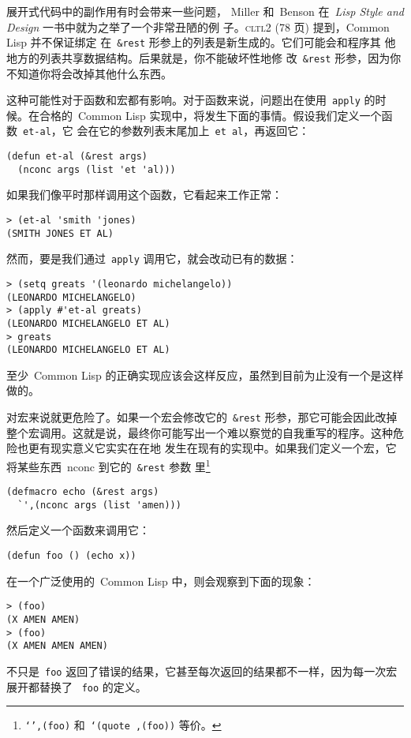 展开式代码中的副作用有时会带来一些问题，
Miller 和~Benson 在~\emph{Lisp Style and Design} 一书中就为之举了一个非常丑陋的例
子。\textsc{cltl}2 (78 页) 提到，Common Lisp 并不保证绑定
在~\texttt{\&rest} 形参上的列表是新生成的。它们可能会和程序其
他地方的列表共享数据结构。后果就是，你不能破坏性地修
改~\texttt{\&rest} 形参，因为你不知道你将会改掉其他什么东西。

这种可能性对于函数和宏都有影响。对于函数来说，问题出在使用~\texttt{apply} 的时候。在合格的~Common Lisp 实现中，将发生下面的事情。假设我们定义一个函数~\texttt{et-al}，它
会在它的参数列表末尾加上~\texttt{et al}，再返回它：
\begin{lstlisting}
(defun et-al (&rest args)
  (nconc args (list 'et 'al)))
\end{lstlisting}
如果我们像平时那样调用这个函数，它看起来工作正常：
\begin{lstlisting}
> (et-al 'smith 'jones)
(SMITH JONES ET AL)
\end{lstlisting}
然而，要是我们通过~\texttt{apply} 调用它，就会改动已有的数据：
\begin{lstlisting}
> (setq greats '(leonardo michelangelo))
(LEONARDO MICHELANGELO)
> (apply #'et-al greats)
(LEONARDO MICHELANGELO ET AL)
> greats
(LEONARDO MICHELANGELO ET AL)
\end{lstlisting}
至少~Common Lisp 的正确实现应该会这样反应，虽然到目前为止没有一个是这样做的。

对宏来说就更危险了。如果一个宏会修改它的~\texttt{\&rest} 形参，那它可能会因此改掉整个宏调用。这就是说，最终你可能写出一个难以察觉的自我重写的程序。这种危险也更有现实意义\pozhehao{}它实实在在地
发生在现有的实现中。如果我们定义一个宏，它将某些东西~nconc 到它的~\texttt{\&rest} 参数
里\footnote{\texttt{`',(foo)} 和~\texttt{`(quote ,(foo))} 等价。}
\begin{lstlisting}
(defmacro echo (&rest args)
  `',(nconc args (list 'amen)))
\end{lstlisting}
然后定义一个函数来调用它：
\begin{lstlisting}
(defun foo () (echo x))
\end{lstlisting}
在一个广泛使用的~Common Lisp 中，则会观察到下面的现象：
\begin{lstlisting}
> (foo)
(X AMEN AMEN)
> (foo)
(X AMEN AMEN AMEN)
\end{lstlisting}
不只是~\texttt{foo} 返回了错误的结果，它甚至每次返回的结果都不一样，因为每一次宏展开都替换了
~\texttt{foo} 的定义。

